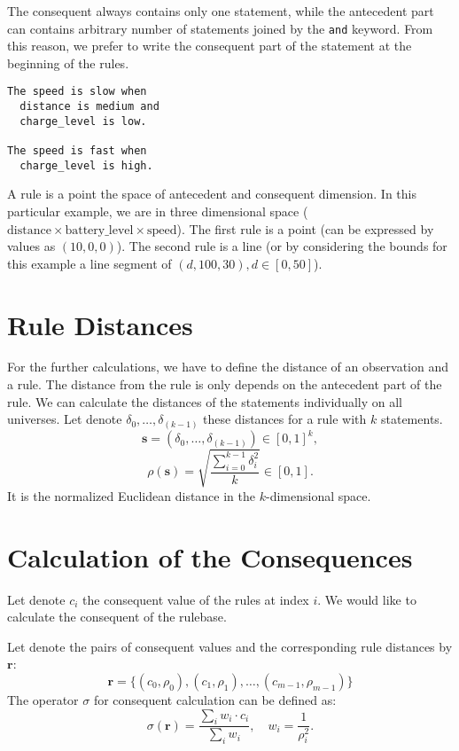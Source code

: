 \documentclass[a4paper,12pt]{article}
\begin{document}
The consequent always contains only one statement, while the antecedent part can contains arbitrary number of statements joined by the \texttt{and} keyword. From this reason, we prefer to write the consequent part of the statement at the beginning of the rules.

\begin{verbatim}
The speed is slow when
  distance is medium and
  charge_level is low.

The speed is fast when
  charge_level is high.
\end{verbatim}

A rule is a point the space of antecedent and consequent dimension. In this particular example, we are in three dimensional space ($\text{distance} \times \text{battery\_level} \times \text{speed}$). The first rule is a point (can be expressed by values as $(10, 0, 0)$). The second rule is a line (or by considering the bounds for this example a line segment of $(d, 100, 30), d \in [0, 50]$).

\section{Rule Distances}

For the further calculations, we have to define the distance of an observation and a rule. The distance from the rule is only depends on the antecedent part of the rule.
We can calculate the distances of the statements individually on all universes. Let denote $\delta_0, \ldots, \delta_{(k-1)}$ these distances for a rule with $k$ statements.
\[
\textbf{s} = (\delta_0, \ldots, \delta_{(k-1)}) \in [0, 1]^k,
\]
\[
\displaystyle
\rho(\textbf{s}) =
\sqrt{\dfrac{\sum_{i=0}^{k-1} \delta_i^2}{k}}
\in [0, 1].
\]
It is the normalized Euclidean distance in the $k$-dimensional space.

\section{Calculation of the Consequences}

Let denote $c_i$ the consequent value of the rules at index $i$. We would like to calculate the consequent of the rulebase.

Let denote the pairs of consequent values and the corresponding rule distances by $\textbf{r}$:
\[
\textbf{r} = \{(c_0, \rho_0), (c_1, \rho_1), \ldots, (c_{m-1}, \rho_{m-1})\}
\]
The operator $\sigma$ for consequent calculation can be defined as:
\[
\sigma(\textbf{r}) = \dfrac{\sum_{i} w_i \cdot c_i}{\sum_{i} w_i},
\quad w_i = \dfrac{1}{\rho_i^2}.
\]
\end{document}
